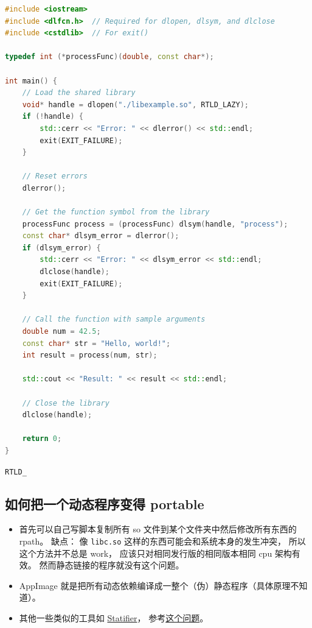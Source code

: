 \begin{lstlisting}[language=cpp]
#include <iostream>
#include <dlfcn.h>  // Required for dlopen, dlsym, and dlclose
#include <cstdlib>  // For exit()

typedef int (*processFunc)(double, const char*);

int main() {
    // Load the shared library
    void* handle = dlopen("./libexample.so", RTLD_LAZY);
    if (!handle) {
        std::cerr << "Error: " << dlerror() << std::endl;
        exit(EXIT_FAILURE);
    }

    // Reset errors
    dlerror();

    // Get the function symbol from the library
    processFunc process = (processFunc) dlsym(handle, "process");
    const char* dlsym_error = dlerror();
    if (dlsym_error) {
        std::cerr << "Error: " << dlsym_error << std::endl;
        dlclose(handle);
        exit(EXIT_FAILURE);
    }

    // Call the function with sample arguments
    double num = 42.5;
    const char* str = "Hello, world!";
    int result = process(num, str);
    
    std::cout << "Result: " << result << std::endl;

    // Close the library
    dlclose(handle);

    return 0;
}
\end{lstlisting}
\verb`RTLD_`

\subsection{如何把一个动态程序变得 portable}
\begin{itemize}
\item 首先可以自己写脚本复制所有 so 文件到某个文件夹中然后修改所有东西的 rpath。 缺点： 像 \verb`libc.so` 这样的东西可能会和系统本身的发生冲突， 所以这个方法并不总是 work， 应该只对相同发行版的相同版本相同 cpu 架构有效。 然而静态链接的程序就没有这个问题。
\item AppImage 就是把所有动态依赖编译成一整个（伪）静态程序（具体原理不知道）。
\item 其他一些类似的工具如 \href{https://statifier.sourceforge.net/}{Statifier}， 参考\href{https://askubuntu.com/questions/537479/is-there-any-open-source-way-to-make-a-static-from-a-dynamic-executable-with-no}{这个问题}。
\end{itemize}
